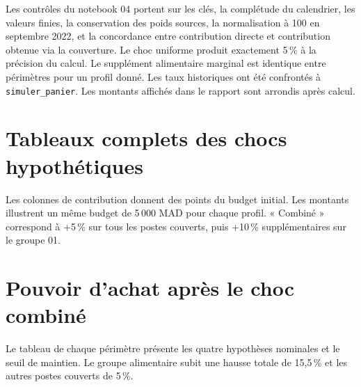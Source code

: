Les contrôles du notebook 04 portent sur les clés, la complétude du calendrier, les valeurs finies, la conservation des poids sources, la normalisation à 100 en septembre 2022, et la concordance entre contribution directe et contribution obtenue via la couverture. Le choc uniforme produit exactement 5\,\% à la précision du calcul. Le supplément alimentaire marginal est identique entre périmètres pour un profil donné. Les taux historiques ont été confrontés à \texttt{simuler\_panier}. Les montants affichés dans le rapport sont arrondis après calcul.

\clearpage
\chapter{Tableaux complets des chocs hypothétiques}\label{ann:chocs}
Les colonnes de contribution donnent des points du budget initial. Les montants illustrent un même budget de 5\,000 MAD pour chaque profil. « Combiné » correspond à +5\,\% sur tous les postes couverts, puis +10\,\% supplémentaires sur le groupe 01.



\clearpage
\chapter{Pouvoir d'achat après le choc combiné}\label{ann:pa-chocs}
Le tableau de chaque périmètre présente les quatre hypothèses nominales et le seuil de maintien. Le groupe alimentaire subit une hausse totale de 15,5\,\% et les autres postes couverts de 5\,\%.


